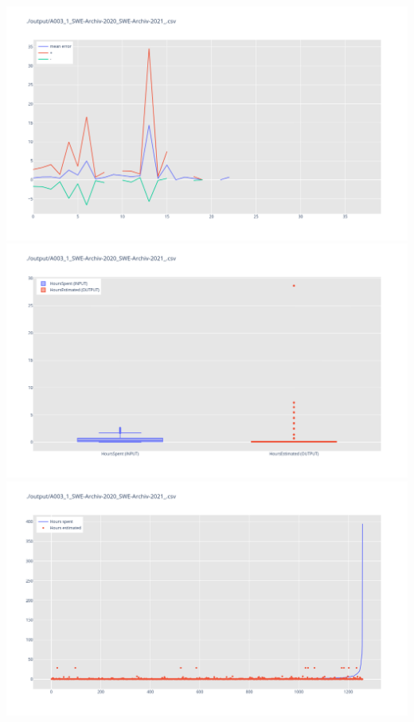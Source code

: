 \includegraphics[width=\textwidth]{Scripts/output/A003_1_SWE-Archiv-2020_SWE-Archiv-2021_.csv.error_distribution.png}
\includegraphics[width=\textwidth]{Scripts/output/A003_1_SWE-Archiv-2020_SWE-Archiv-2021_.csv.png}
\includegraphics[width=\textwidth]{Scripts/output/A003_1_SWE-Archiv-2020_SWE-Archiv-2021_.csv.scatter.png}
